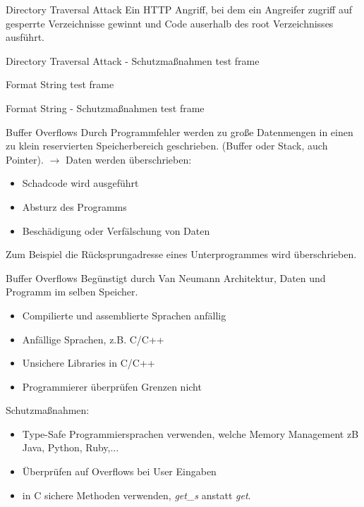 \documentclass[10pt]{beamer}
\begin{document}
\begin{frame}[fragile]{Directory Traversal Attack}
  Ein HTTP Angriff, bei dem ein Angreifer zugriff auf gesperrte Verzeichnisse gewinnt und Code auserhalb des root Verzeichnisses ausf\"uhrt.
\end{frame}

\begin{frame}[fragile]{Directory Traversal Attack - Schutzma{\ss}nahmen}
  test frame
\end{frame}

\begin{frame}[fragile]{Format String}
  test frame
\end{frame}

\begin{frame}[fragile]{Format String - Schutzma{\ss}nahmen}
  test frame
\end{frame}

\begin{frame}[fragile]{Buffer Overflows}
  Durch Programmfehler werden zu gro{\ss}e Datenmengen in einen zu klein reservierten Speicherbereich geschrieben.
  (Buffer oder Stack, auch Pointer).
  \newline
  \newline
  $\rightarrow$ Daten werden \"uberschrieben:
  \begin{itemize}
    \item Schadcode wird ausgef\"uhrt
    \item Absturz des Programms
    \item Besch\"adigung oder Verf\"alschung von Daten
  \end{itemize}
  Zum Beispiel die R\"ucksprungadresse eines Unterprogrammes wird \"uberschrieben.
\end{frame}

\begin{frame}[fragile]{Buffer Overflows}
  Beg\"unstigt durch Van Neumann Architektur, Daten und Programm im selben Speicher.
  \begin{itemize}
    \item Compilierte und assemblierte Sprachen anf\"allig
    \item Anf\"allige Sprachen, z.B. C/C++
    \item Unsichere Libraries in C/C++
    \item Programmierer \"uberpr\"ufen Grenzen nicht
  \end{itemize}
  Schutzma{\ss}nahmen:
  \begin{itemize}
    \item Type-Safe Programmiersprachen verwenden, welche Memory Management zB Java, Python, Ruby,...
    \item \"Uberpr\"ufen auf Overflows bei User Eingaben
    \item in C sichere Methoden verwenden, \textit{get\_s} anstatt \textit{get}.
  \end{itemize}
\end{frame}
\end{document}
